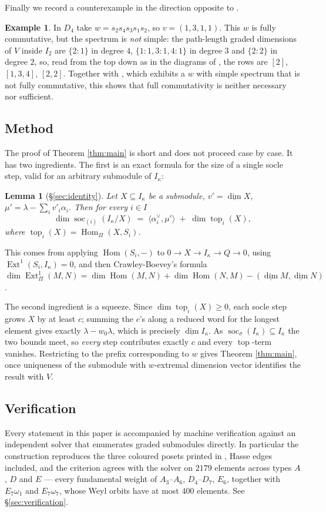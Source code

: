 \documentclass[11pt,reqno]{amsart}
\theoremstyle{plain}
\newtheorem{lemma}[theorem]{Lemma}
\theoremstyle{definition}
\newtheorem{example}[theorem]{Example}
\DeclareMathOperator{\soc}{soc}
\DeclareMathOperator{\topp}{top}
\DeclareMathOperator{\Hom}{Hom}
\DeclareMathOperator{\Ext}{Ext}
\newcommand{\Pia}{\Pi}
\newcommand{\dimv}{\underline{\dim}}
\newcommand{\al}{\alpha}
\newcommand{\om}{\omega}
\newcommand{\la}{\lambda}
\newcommand{\ka}{\kappa}
\begin{document}
Finally we record a counterexample in the direction opposite to
\cite[Ex.~5.12]{DKK}.

\begin{example}\label{ex:fcbad}
In $D_4$ take $w=s_2s_4s_3s_1s_2$, so $v=(1,3,1,1)$.  This $w$ is fully
commutative, but the spectrum is \emph{not} simple: the path-length graded
dimensions of $V$ inside $I_2$ are $\{2:1\}$ in degree $4$, $\{1:1,3:1,4:1\}$
in degree $3$ and $\{2:2\}$ in degree $2$, so, read from the top down as in the
diagrams of \cite{DKK}, the rows are $[2]$, $[1,3,4]$, $[2,2]$.  Together with \cite[Ex.~5.12]{DKK}, which exhibits a
$w$ with simple spectrum that is not fully commutative, this shows that full
commutativity is neither necessary nor sufficient.
\end{example}

\subsection{Method}
The proof of Theorem \ref{thm:main} is short and does not proceed case by case.
It has two ingredients.  The first is an exact formula for the size of a single
socle step, valid for an arbitrary submodule of $I_\ka$:

\begin{lemma}[\S\ref{sec:identity}]\label{lem:cb}
Let $X\subseteq I_\ka$ be a submodule, $v'=\dimv X$, $\mu'=\la-\sum_i
v'_i\al_i$.  Then for every $i\in I$
\[
   \dim\soc_{(i)}\!\left(I_\ka/X\right)
   \;=\;\langle\al_i^\vee,\mu'\rangle\;+\;\dim\topp_i(X),
\]
where $\topp_i(X)=\Hom_\Pia(X,S_i)$.
\end{lemma}

This comes from applying $\Hom(S_i,-)$ to $0\to X\to I_\ka\to Q\to0$, using
$\Ext^1(S_i,I_\ka)=0$, and then Crawley-Boevey's formula
$\dim\Ext^1_\Pia(M,N)=\dim\Hom(M,N)+\dim\Hom(N,M)-(\dimv M,\dimv N)$
\cite{CB}.

The second ingredient is a squeeze.  Since $\dim\topp_i(X)\ge0$, each socle
step grows $X$ by at least $c$; summing the $c$'s along a reduced word for the
longest element gives exactly $\la-w_0\la$, which is precisely $\dimv I_\ka$.
As $\soc_\sigma(I_\ka)\subseteq I_\ka$ the two bounds meet, so \emph{every}
step contributes exactly $c$ and every $\topp$-term vanishes.  Restricting to
the prefix corresponding to $w$ gives Theorem \ref{thm:main}, once uniqueness
of the submodule with $w$-extremal dimension vector \cite[Prop.~4.9]{ST}
identifies the result with $V$.

\subsection{Verification}
Every statement in this paper is accompanied by machine verification against an
independent solver that enumerates graded submodules directly.  In particular
the construction reproduces the three coloured posets printed in
\cite[pp.~82--83]{DKK}, Hasse edges included, and the criterion agrees with the
solver on $2179$ elements across types $A$, $D$ and $E$ --- every fundamental
weight of $A_3$--$A_6$, $D_4$--$D_7$, $E_6$, together with $E_7\om_1$ and
$E_7\om_7$, whose Weyl orbits have at most $400$ elements.  See \S\ref{sec:verification}.
\end{document}

